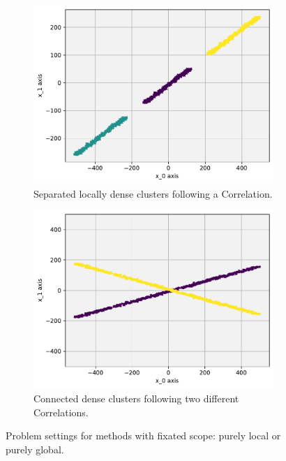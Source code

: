 \begin{figure}
    \centering
    \begin{subfigure}[t]{0.47\textwidth}
      \centering
      \includegraphics[width=.8\textwidth]{figures_method/piecewisecorrs.pdf}
      \captionsetup{width=0.8\linewidth}
      \caption{Separated locally dense clusters following a Correlation.}
      \label{fig:scenario1}
    \end{subfigure}%
    \begin{subfigure}[t]{0.47\textwidth}
      \centering
      \includegraphics[width=.8\textwidth]{figures_method/xcorrs.pdf}
      \captionsetup{width=0.8\linewidth}
      \caption{Connected dense clusters following two different Correlations.}
      \label{fig:scenario2}
    \end{subfigure}
    \caption{Problem settings for methods with fixated scope: purely local or purely global.}
    \label{fig:badscenario}
\end{figure}

